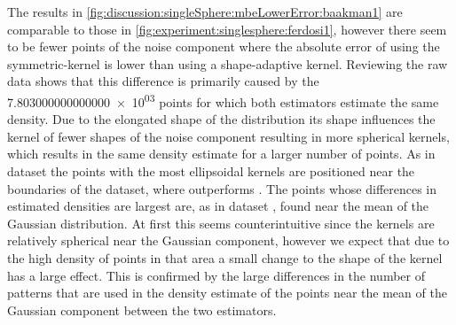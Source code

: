 

		The results in \cref{fig:discussion:singleSphere:mbeLowerError:baakman1} are comparable to those in \cref{fig:experiment:singlesphere:ferdosi1}, however there seem to be fewer points of the noise component where the absolute error of using the symmetric-kernel is lower than using a shape-adaptive kernel. Reviewing the raw data shows that this difference is primarily caused by the \num{7.803000000000000e+03} points for which both estimators estimate the same density. Due to the elongated shape of the distribution its shape influences the kernel of fewer shapes of the noise component resulting in more spherical kernels, which results in the same density estimate for a larger number of points. 
		As in dataset \ferdosiOne the points with the most ellipsoidal kernels are positioned near the boundaries of the dataset, where \sambe outperforms \mbe. 
		The points whose differences in estimated densities are largest are, as in dataset \ferdosiOne, found near the mean of the Gaussian distribution. At first this seems counterintuitive since the kernels are relatively spherical near the Gaussian component, however we expect that due to the high density of points in that area a small change to the shape of the kernel has a large effect. This is confirmed by the large differences in the number of patterns that are used in the density estimate of the points near the mean of the Gaussian component between the two estimators. 




